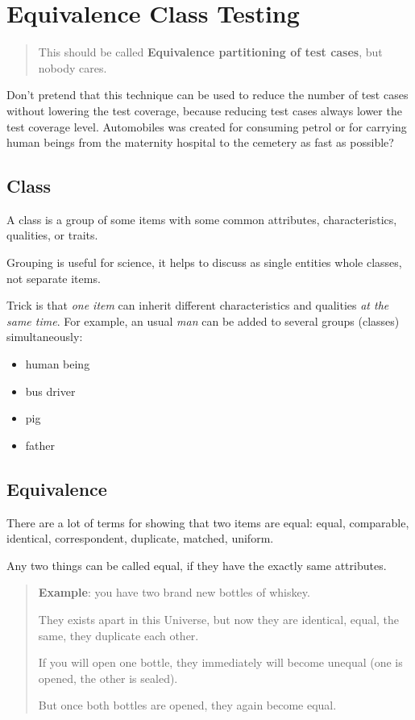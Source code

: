 \section{Equivalence Class Testing}
\label{sec:Equivalence Class Testing}

\begin{quote}
This should be called \textbf{Equivalence partitioning of test cases}, but nobody cares.\end{quote} 

Don't pretend that this technique can be used to reduce the number of test cases without lowering the test coverage, because reducing test cases always lower the test coverage level. Automobiles was created for consuming petrol or for carrying human beings from the maternity hospital to the cemetery as fast as possible?

\subsection{Class}

A class is a group of some items with some common attributes, characteristics, qualities, or traits. 

Grouping is useful for science, it helps to discuss as single entities whole classes, not separate items.

Trick is that \emph{one item} can inherit different characteristics and qualities  \emph{at the same time}. For example, an usual \emph{man} can be added to several groups (classes) simultaneously: 

\begin{itemize}
 \item 
 human being
 \item 
 bus driver
 \item 
 pig
 \item 
 father
\end{itemize}

\subsection{Equivalence}

There are a lot of terms for showing that two items are equal: equal, comparable, identical, correspondent, duplicate, matched, uniform.

Any two things can be called equal, if they have the exactly same attributes. 

\begin{quote}
 
\textbf{Example}: you have two brand new bottles of whiskey. 

They exists apart in this Universe, but now they are identical, equal, the same, they duplicate each other.

If you will open one bottle, they immediately will become unequal (one is opened, the other is sealed).

But once both bottles are opened, they again become equal.
\end{quote}

